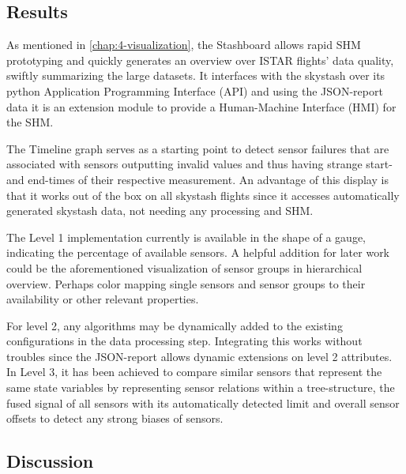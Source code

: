 \subsection{Results}
As mentioned in \ref{chap:4-visualization}, the Stashboard allows rapid SHM prototyping and quickly generates an overview over ISTAR flights' data quality, swiftly summarizing the large datasets. It interfaces with the skystash over its python Application Programming Interface (API) and using the JSON-report data it is an extension module to provide a Human-Machine Interface (HMI) for the SHM.

The Timeline graph serves as a starting point to detect sensor failures that are associated with sensors outputting invalid values and thus having strange start- and end-times of their respective measurement. An advantage of this display is that it works out of the box on all skystash flights  since it accesses automatically generated skystash data, not needing any processing and SHM.

The Level 1 implementation currently is available in the shape of a gauge, indicating the percentage of available sensors. A helpful addition for later work could be the aforementioned visualization of sensor groups in hierarchical overview. Perhaps color mapping single sensors and sensor groups to their availability or other relevant properties.

For level 2, any algorithms may be dynamically added to the existing configurations in the data processing step. Integrating this works without troubles since the JSON-report allows dynamic extensions on level 2 attributes.
In Level 3, it has been achieved to compare similar sensors that represent the same state variables by representing sensor relations within a tree-structure, the fused signal of all sensors with its automatically detected limit and overall sensor offsets to detect any strong biases of sensors.

\subsection{Discussion}


